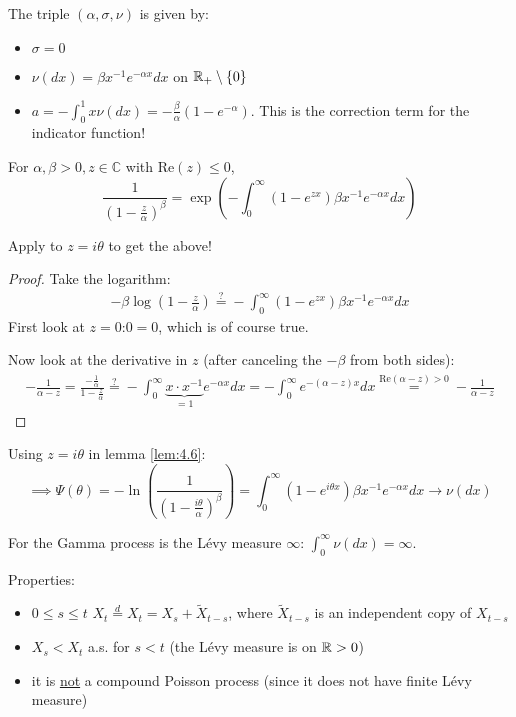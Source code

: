 The triple $(\alpha,\sigma,\nu)$ is given by:
\begin{itemize}
    \item $\sigma=0$
    \item $\nu(dx)=\beta x^{-1}e^{-\alpha x}dx$ on $\mathbb{R}_+\setminus \{0\}$
    \item $a=-\int_0^1 x\nu(dx)=-\frac{\beta}{\alpha}(1-e^{-\alpha})$. This is the correction term for the indicator function!
\end{itemize}

\begin{lemma}\label{lem:4.6}
    For $\alpha,\beta>0,z\in \mathbb{C}$ with Re$(z)\leq 0$,
    \[\frac{1}{\left(1-\frac{z}{\alpha}\right)^\beta}=\exp\left(-\int_0^\infty (1-e^{zx})\beta x^{-1}e^{-\alpha x}dx\right)\]
\end{lemma}

Apply to $z=i\theta$ to get the above!

\begin{proof}
    Take the logarithm:
    \begin{align*}
        -\beta\log\left(1-\frac{z}{\alpha}\right) \stackrel{?}{=}-\int_0^\infty (1-e^{zx})\beta x^{-1}e^{-\alpha x}dx
    \end{align*}
    First look at $z=0$:$0=0$, which is of course true.

    Now look at the derivative in $z$ (after canceling the $-\beta$ from both  sides):
    \begin{align*}
        -\frac{1}{\alpha-z}=\frac{-\frac{1}{\alpha}}{1-\frac{z}{\alpha}}\stackrel{?}{=}-\int_0^\infty \underbrace{x \cdot x^{-1}}_{=1} e^{-\alpha x}dx = -\int_0^\infty e^{-(\alpha-z)x}dx\stackrel{\text{Re}(\alpha-z)>0}{=}-\frac{1}{\alpha-z}
    \end{align*}
\end{proof}

Using $z=i\theta$ in lemma \ref{lem:4.6}:
\[\implies \Psi(\theta)=-\ln\left(\frac{1}{(1-\frac{i\theta}{\alpha})^\beta}\right)=\int_0^\infty (1-e^{i\theta x})\beta x^{-1}e^{-\alpha x}dx\to \nu(dx)\]

\begin{aremark}
    For the Gamma process is the Lévy measure $\infty$: $\int_0^\infty \nu(dx)=\infty$.
\end{aremark}

Properties: 
\begin{itemize}
    \item $0\leq s\leq t$ $X_t\stackrel{d}{=}X_t=X_s+\tilde{X}_{t-s}$, where $\tilde{X}_{t-s}$ is an independent copy of $X_{t-s}$
    \item $X_s<X_t$ a.s. for $s<t$ (the Lévy measure is on $\mathbb{R}>0$)
    \item it is \underline{not} a compound Poisson process (since it does not have finite Lévy measure) 
\end{itemize}

